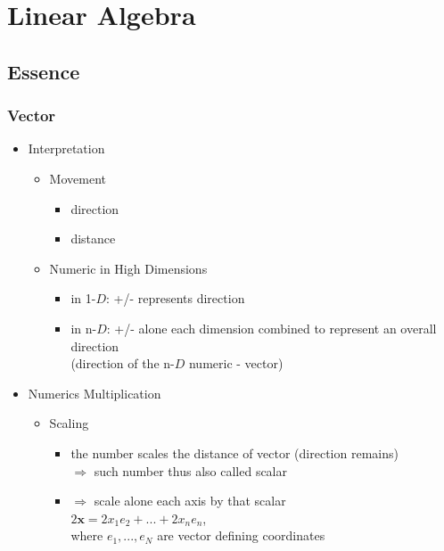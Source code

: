 \section{Linear Algebra}

\subsection{Essence}
\subsubsection{Vector}
\begin{itemize}
\item Interpretation
	\begin{itemize}
	\item Movement
		\begin{itemize}
		\item direction
		\item distance
		\end{itemize}
	\item Numeric in High Dimensions
		\begin{itemize}
		\item in 1-$D$: +/- represents direction
		\item in n-$D$: +/- alone each dimension combined to represent an overall direction \\
			(direction of the n-$D$ numeric - vector)
		\end{itemize}
	\end{itemize}

\item Numerics Multiplication
	\begin{itemize}
	\item Scaling
		\begin{itemize}
		\item the number scales the distance of vector (direction remains) \\
			$\Rightarrow$ such number thus also called scalar
		\item $\Rightarrow$ scale alone each axis by that scalar \\
			$2\mathbf x = 2x_1e_2+...+2x_ne_n$, \\ 
			where $e_1,...,e_N$ are vector defining coordinates
		\end{itemize}
	\end{itemize}


\end{itemize}
